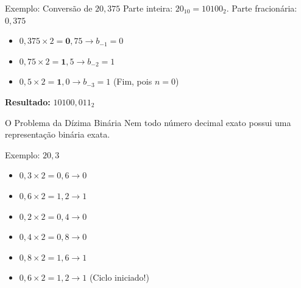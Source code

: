 \begin{frame}{Exemplo: Conversão de $20,375$}
    Parte inteira: $20_{10} = 10100_2$. Parte fracionária: $0,375$

    \begin{itemize}
        \item $0,375 \times 2 = \mathbf{0},75 \rightarrow b_{-1} = 0$
        \item $0,75 \times 2 = \mathbf{1},5 \rightarrow b_{-2} = 1$
        \item $0,5 \times 2 = \mathbf{1},0 \rightarrow b_{-3} = 1$ (Fim, pois $n=0$)
    \end{itemize}

    \begin{center}
        \textbf{Resultado:} $10100,011_2$
    \end{center}


\end{frame}

\begin{frame}{O Problema da Dízima Binária}
    Nem todo número decimal exato possui uma representação binária exata.

    \begin{exampleblock}{Exemplo: $20,3$}
        \begin{itemize}
            \item $0,3 \times 2 = 0,6 \rightarrow 0$
            \item $0,6 \times 2 = 1,2 \rightarrow 1$
            \item $0,2 \times 2 = 0,4 \rightarrow 0$
            \item $0,4 \times 2 = 0,8 \rightarrow 0$
            \item $0,8 \times 2 = 1,6 \rightarrow 1$
            \item $0,6 \times 2 = 1,2 \rightarrow 1$ (Ciclo iniciado!)
        \end{itemize}
    \end{exampleblock}

\end{frame}

